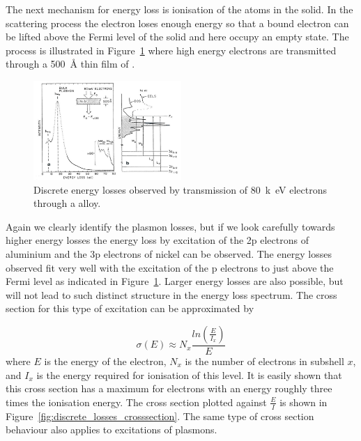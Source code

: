 The next mechanism for energy loss is ionisation of the atoms in the solid. In the scattering process the electron loses enough energy so that a bound electron can be lifted above the Fermi level of the solid and here occupy an empty state. The process is illustrated in Figure~\ref{fig:discrete_losses} where high energy electrons are transmitted through a \SI{500}{\angstrom} thin film of .

\begin{figure}[htbp]
\centering
\includegraphics[width=0.5\textwidth]{figures/02_10}
\caption{Discrete energy losses observed by transmission of \SI{80}{k\electronvolt} electrons through a  alloy.}
\label{fig:discrete_losses}
\end{figure}

Again we clearly identify the plasmon losses, but if we look carefully towards higher energy losses the energy loss by excitation of the 2p electrons of aluminium and the 3p electrons of nickel can be observed. The energy losses observed fit very well with the excitation of the p electrons to just above the Fermi level as indicated in Figure~\ref{fig:discrete_losses}. Larger energy losses are also possible, but will not lead to such distinct structure in the energy loss spectrum. The cross section for this type of excitation can be approximated by

\begin{equation}
\sigma(E) \approx N_x\frac{ln(\frac{E}{I_x})}{E}
\end{equation}
where $E$ is the energy of the electron, $N_x$ is the number of electrons in subshell $x$, and $I_x$ is the energy required for ionisation of this level. It is easily shown that this cross section has a maximum for electrons with an energy roughly three times the ionisation energy. The cross section plotted against $\frac{E}{I}$ is shown in Figure~\ref{fig:discrete_losses_crosssection}. The same type of cross section behaviour also applies to excitations of plasmons.

